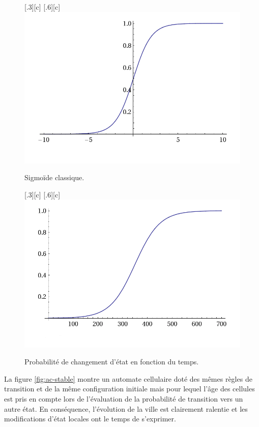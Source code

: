 \documentclass[12pt]{article}
\begin{document}
\begin{figure}[H]
  \centering
  \subcaptionbox{}[.3\linewidth][c]{
  }
  \subcaptionbox{}[.6\linewidth][c]{
    \includegraphics[width=.6\linewidth]{images/sigmoid.png}
  }
  \caption{Sigmoïde classique.}
  \label{fig:sigmoide1}
\end{figure}

\begin{figure}[H]
  \centering
  \subcaptionbox{}[.3\linewidth][c]{
  }
  \subcaptionbox{}[.6\linewidth][c]{
    \includegraphics[width=.6\linewidth]{images/sigmoid-age.png}
  }
  \caption{Probabilité de changement d'état en fonction du temps.}
  \label{fig:sigmoide2}
\end{figure}

La figure \ref{fig:ac-stable} montre un automate cellulaire doté des
mêmes règles de transition et de la même configuration initiale mais
pour lequel l'âge des cellules est pris en compte lors de l'évaluation
de la probabilité de transition vers un autre état. En conséquence,
l'évolution de la ville est clairement ralentie et les modifications
d'état locales ont le temps de s'exprimer.
\end{document}
